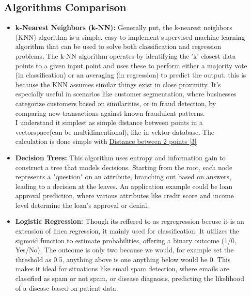 \documentclass[11pt, a4paper]{article}
\begin{document}
\subsection{Algorithms Comparison}
\begin{itemize}
    
\item \textbf{k-Nearest Neighbors (k-NN):} Generally put, the k-nearest neighbors (KNN) algorithm is a simple, easy-to-implement supervised machine learning algorithm that can be used to solve both classification and regression problems. The k-NN algorithm operates by identifying the 'k' closest data points to a given input point and uses these to perform either a majority vote (in classification) or an averaging (in regression) to predict the output. this is because the  KNN assumes similar things exist in close proximity. It's especially useful in scenarios like customer segmentation, where businesses categorize customers based on similarities, or in fraud detection, by comparing new transactions against known fraudulent patterns.\\
I understand it simplest as simple distance between points in a \\
vectorspace(can be multidimentional), like in vektor database. The calculation is done simple with \underline{Distance between 2 points [3]}

\item \textbf{Decision Trees:} This algorithm uses entropy and information gain to construct a tree that models decisions. Starting from the root, each node represents a "question" on an attribute, branching out based on answers, leading to a decision at the leaves. An application example could be loan approval prediction, where various attributes like credit score and income level determine the loan's approval or denial.

\item \textbf{Logistic Regression:} Though its reffered to as regregression becuse it is an extension of linea regression, it mainly used for classification. It utilizes the sigmoid function to estimate probabilities, offering a binary outcome (1/0, Yes/No). The outcome is only two because we would, for example set the threshold as 0.5, anything above is one anything below would be 0. This makes it ideal for situations like email spam detection, where emails are classified as spam or not spam, or disease diagnosis, predicting the likelihood of a disease based on patient data.
\end{itemize}
\end{document}
